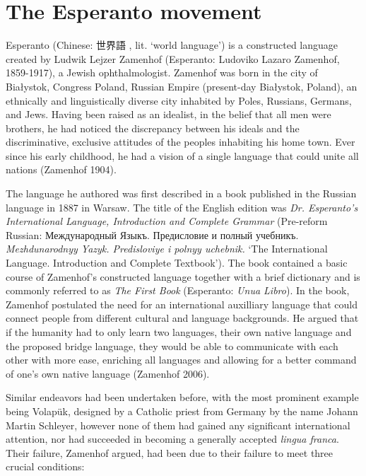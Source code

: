 \section{The Esperanto movement}

Esperanto (Chinese: 世界語 , lit. `world language') is a constructed language created by Ludwik Lejzer Zamenhof (Esperanto: Ludoviko Lazaro Zamenhof, 1859-1917), a Jewish ophthalmologist.
Zamenhof was born in the city of Białystok, Congress Poland, Russian Empire (present-day Białystok, Poland), an ethnically and linguistically diverse city inhabited by Poles, Russians, Germans, and Jews.
Having been raised as an idealist, in the belief that all men were brothers, he had noticed the discrepancy between his ideals and the discriminative, exclusive attitudes of the peoples inhabiting his home town.
Ever since his early childhood, he had a vision of a single language that could unite all nations (Zamenhof 1904).

The language he authored was first described in a book published in the Russian language in 1887 in Warsaw. The title of the English edition was \textit{Dr. Esperanto's International Language, Introduction and Complete Grammar} (Pre-reform Russian: Между\-на\-род\-ный Языкъ. Предисловие и полный учебникъ. \textit{Mezhdunarodnyy Yazyk. Predisloviye i polnyy uchebnik.} `The International Language. Introduction and Complete Textbook').
The book contained a basic course of Zamenhof's constructed language together with a brief dictionary and is commonly referred to as \textit{The First Book} (Esperanto: \textit{Unua Libro}).
In the book, Zamenhof postulated the need for an international auxilliary language that could connect people from different cultural and language backgrounds.
He argued that if the humanity had to only learn two languages, their own native language and the proposed bridge language, they would be able to communicate with each other with more ease, enriching all languages and allowing for a better command of one's own native language (Zamenhof 2006).

Similar endeavors had been undertaken before, with the most prominent example being Volapük, designed by a Catholic priest from Germany by the name Johann Martin Schleyer, however none of them had gained any significant international attention, nor had succeeded in becoming a generally accepted \textit{lingua franca}.
Their failure, Zamenhof argued, had been due to their failure to meet three crucial conditions:

